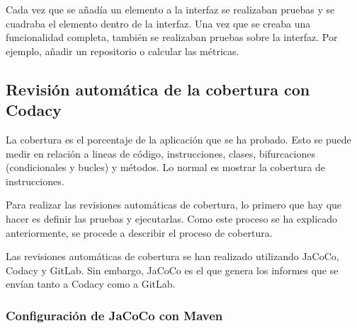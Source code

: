 
Cada vez que se añadía un elemento a la interfaz se realizaban pruebas y se cuadraba el elemento dentro de la interfaz. Una vez que se creaba una funcionalidad completa, también se realizaban pruebas sobre la interfaz. Por ejemplo, añadir un repositorio o calcular las métricas.

\subsection{Revisión automática de la cobertura con Codacy}

La cobertura es el porcentaje de la aplicación que se ha probado. Esto se puede medir en relación a lineas de código, instrucciones, clases, bifurcaciones (condicionales y bucles) y métodos. Lo normal es mostrar la cobertura de instrucciones.

Para realizar las revisiones automáticas de cobertura, lo primero que hay que hacer es definir las pruebas y ejecutarlas. Como este proceso se ha explicado anteriormente, se procede a describir el proceso de cobertura.

Las revisiones automáticas de cobertura se han realizado utilizando JaCoCo, Codacy y GitLab. Sin embargo, JaCoCo es el que genera los informes que se envían tanto a Codacy como a GitLab.

\subsubsection{Configuración de JaCoCo con Maven}

